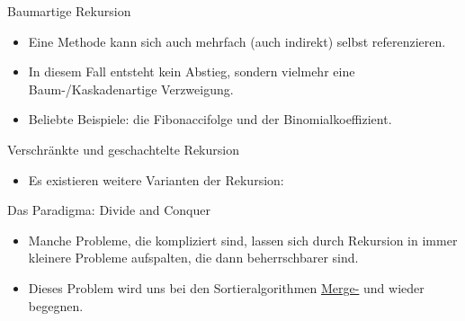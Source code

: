 \begin{frame}[fragile]{Baumartige Rekursion}
    \begin{itemize}[<+(1)->]
        \widei
        \item Eine Methode kann sich auch mehrfach (auch indirekt) selbst referenzieren.
        \item In diesem Fall entsteht kein  Abstieg,\pause{} sondern vielmehr eine Baum-/Kaskadenartige Verzweigung.
        \item Beliebte Beispiele: die Fibonaccifolge und der Binomialkoeffizient.
    \end{itemize}
    \vfill\hbox{}
\end{frame}


\begin{frame}[fragile]{Verschränkte und geschachtelte Rekursion}
    \begin{itemize}[<+(1)->]
        \widei
        \item Es existieren weitere Varianten der Rekursion: 
    \end{itemize}
\end{frame}

\begin{frame}{Das Paradigma: Divide and Conquer}
    \begin{itemize}[<+(1)->]
        \widei
        \item Manche Probleme, die kompliziert sind,\pause{} lassen sich durch Rekursion in immer kleinere Probleme aufspalten, die dann beherrschbarer sind.
        \item Dieses Problem wird uns bei den Sortieralgorithmen \hyperlink{mrk:sort-Mergesort}{Merge-} und  wieder begegnen.
    \end{itemize}
\end{frame}

